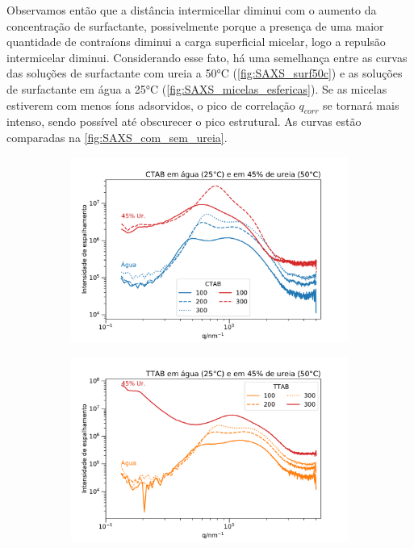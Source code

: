 	Observamos então que a distância intermicellar diminui com o aumento da concentração de surfactante, possivelmente porque a presença de uma maior quantidade de contraíons diminui a carga superficial micelar, logo a repulsão intermicelar diminui. Considerando esse fato, há uma semelhança entre as curvas das soluções de surfactante com ureia a 50°C (\autoref{fig:SAXS_surf50c}) e as soluções de surfactante em água a 25°C (\autoref{fig:SAXS_micelas_esfericas}). Se as micelas estiverem com menos íons adsorvidos, o pico de correlação \(q_{corr}\) se tornará mais intenso, sendo possível até obscurecer o pico estrutural. As curvas estão comparadas na \autoref{fig:SAXS_com_sem_ureia}.
	
	
	\begin{figure}[h]
		\begin{subfigure}[t]{0.45\textwidth}
			\centering
			\includegraphics[width=\textwidth]{./imagens/saxs/micelas_CTAB_agua_ureia}
			\caption{\CTAB}
			\label{fig:SAXS_CTAB_com_sem_ureia}
		\end{subfigure} \qquad %
		\begin{subfigure}[t]{0.45\textwidth}
			\centering
			\includegraphics[width=\textwidth]{./imagens/saxs/micelas_TTAB_agua_ureia}

\end{subfigure}
\end{figure}
